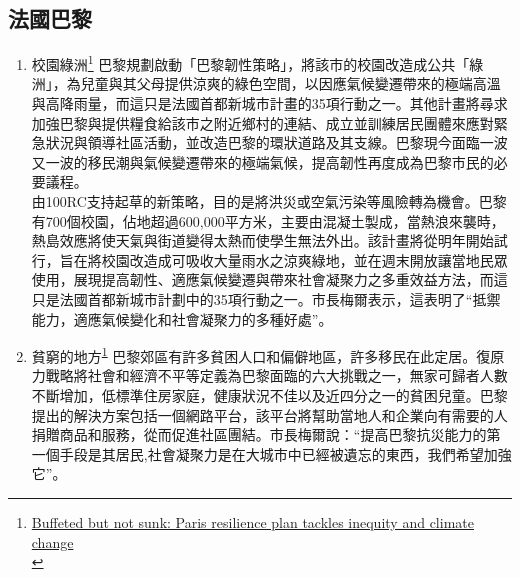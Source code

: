 \documentclass[a4paper,12pt]{article}
\begin{document}
\subsection{法國巴黎}
\label{sec:orgd2b77e1}
\begin{enumerate}
\item 校園綠洲\footnote{\href{https://www.eco-business.com/news/buffeted-but-not-sunk-paris-resilience-plan-tackles-inequity-and-climate-change/}{Buffeted but not sunk: Paris resilience plan tackles inequity and climate change }\\\label{org7eac228}}
\label{sec:org9b259f1}
巴黎規劃啟動「巴黎韌性策略」，將該市的校園改造成公共「綠洲」，為兒童與其父母提供涼爽的綠色空間，以因應氣候變遷帶來的極端高溫與高降雨量，而這只是法國首都新城市計畫的35項行動之一。其他計畫將尋求加強巴黎與提供糧食給該市之附近鄉村的連結、成立並訓練居民團體來應對緊急狀況與領導社區活動，並改造巴黎的環狀道路及其支線。巴黎現今面臨一波又一波的移民潮與氣候變遷帶來的極端氣候，提高韌性再度成為巴黎市民的必要議程。\\
由100RC支持起草的新策略，目的是將洪災或空氣污染等風險轉為機會。巴黎有700個校園，佔地超過600,000平方米，主要由混凝土製成，當熱浪來襲時，熱島效應將使天氣與街道變得太熱而使學生無法外出。該計畫將從明年開始試行，旨在將校園改造成可吸收大量雨水之涼爽綠地，並在週末開放讓當地民眾使用，展現提高韌性、適應氣候變遷與帶來社會凝聚力之多重效益方法，而這只是法國首都新城市計劃中的35項行動之一。市長梅爾表示，這表明了“抵禦能力，適應氣候變化和社會凝聚力的多種好處”。\\

\item 貧窮的地方\textsuperscript{\ref{org7eac228}}
\label{sec:org1151061}
巴黎郊區有許多貧困人口和偏僻地區，許多移民在此定居。復原力戰略將社會和經濟不平等定義為巴黎面臨的六大挑戰之一，無家可歸者人數不斷增加，低標準住房家庭，健康狀況不佳以及近四分之一的貧困兒童。巴黎提出的解決方案包括一個網路平台，該平台將幫助當地人和企業向有需要的人捐贈商品和服務，從而促進社區團結。市長梅爾說：“提高巴黎抗災能力的第一個手段是其居民,社會凝聚力是在大城市中已經被遺忘的東西，我們希望加強它”。\\


\end{enumerate}
\end{document}
